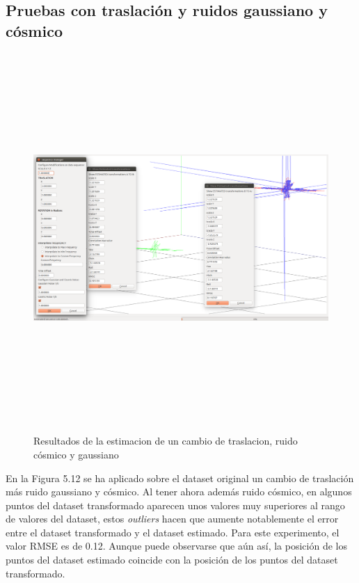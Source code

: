 \subsection{Pruebas con traslación y ruidos gaussiano y cósmico}
\begin{figure}[H]
\begin{center}
\label{fig:opciones de View}\includegraphics[height=14.0cm,width=18.0cm]{img/cap6/Trasla_GaussianCosmicNoise_abba.png}
\hspace{0.5cm}

\end{center}

\caption{Resultados de la estimacion de un cambio de traslacion, ruido cósmico y gaussiano}
\end{figure}

En la Figura 5.12 se ha aplicado sobre el dataset original un cambio de traslación más ruido gaussiano y cósmico. Al tener ahora además ruido cósmico, en algunos puntos del dataset transformado aparecen unos valores muy superiores al rango de valores del dataset, estos \textit{outliers} hacen que aumente notablemente el error entre el dataset transformado y el dataset estimado. Para este experimento, el valor RMSE es de 0.12. Aunque puede observarse que aún así, la posición de los puntos del dataset estimado coincide con la posición de los puntos del dataset transformado.




